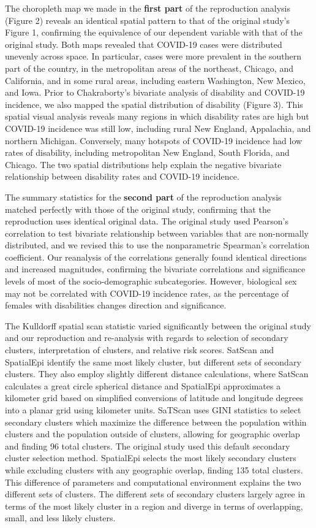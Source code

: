 \documentclass[
]{article}
\begin{document}
The choropleth map we made in the \textbf{first part} of the
reproduction analysis (Figure 2) reveals an identical spatial pattern to
that of the original study's Figure 1, confirming the equivalence of our
dependent variable with that of the original study. Both maps revealed
that COVID-19 cases were distributed unevenly across space. In
particular, cases were more prevalent in the southern part of the
country, in the metropolitan areas of the northeast, Chicago, and
California, and in some rural areas, including eastern Washington, New
Mexico, and Iowa. Prior to Chakraborty's bivariate analysis of
disability and COVID-19 incidence, we also mapped the spatial
distribution of disability (Figure 3). This spatial visual analysis
reveals many regions in which disability rates are high but COVID-19
incidence was still low, including rural New England, Appalachia, and
northern Michigan. Conversely, many hotspots of COVID-19 incidence had
low rates of disability, including metropolitan New England, South
Florida, and Chicago. The two spatial distributions help explain the
negative bivariate relationship between disability rates and COVID-19
incidence.

The summary statistics for the \textbf{second part} of the reproduction
analysis matched perfectly with those of the original study, confirming
that the reproduction uses identical original data. The original study
used Pearson's correlation to test bivariate relationship between
variables that are non-normally distributed, and we revised this to use
the nonparametric Spearman's correlation coefficient. Our reanalysis of
the correlations generally found identical directions and increased
magnitudes, confirming the bivariate correlations and significance
levels of most of the socio-demographic subcategories. However,
biological sex may not be correlated with COVID-19 incidence rates, as
the percentage of females with disabilities changes direction and
significance.

The Kulldorff spatial scan statistic varied significantly between the
original study and our reproduction and re-analysis with regards to
selection of secondary clusters, interpretation of clusters, and
relative risk scores. SatScan and SpatialEpi identify the same most
likely cluster, but different sets of secondary clusters. They also
employ slightly different distance calculations, where SatScan
calculates a great circle spherical distance and SpatialEpi approximates
a kilometer grid based on simplified conversions of latitude and
longitude degrees into a planar grid using kilometer units. SaTScan uses
GINI statistics to select secondary clusters which maximize the
difference between the population within clusters and the population
outside of clusters, allowing for geographic overlap and finding 96
total clusters. The original study used this default secondary cluster
selection method. SpatialEpi selects the most likely secondary clusters
while excluding clusters with any geographic overlap, finding 135 total
clusters. This difference of parameters and computational environment
explains the two different sets of clusters. The different sets of
secondary clusters largely agree in terms of the most likely cluster in
a region and diverge in terms of overlapping, small, and less likely
clusters.
\end{document}
